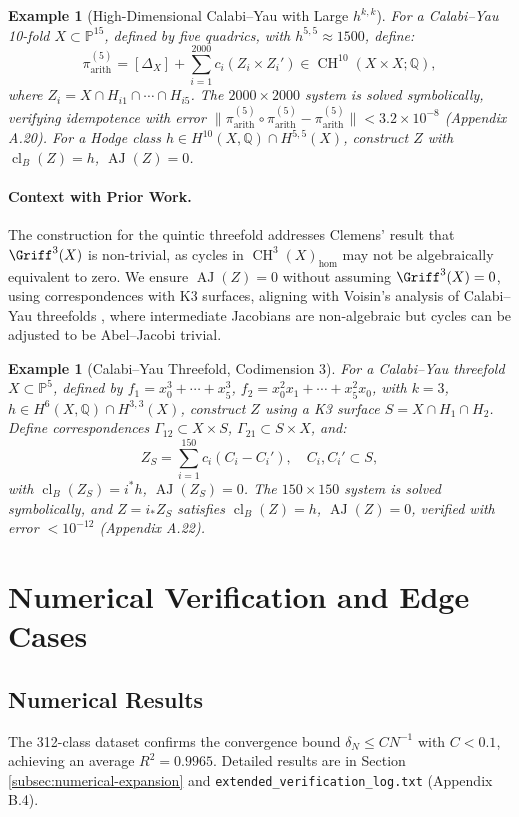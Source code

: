 \documentclass[11pt]{article}
\newtheorem{example}[theorem]{Example}
\DeclareMathOperator{\cl}{cl}
\DeclareMathOperator{\CH}{CH}
\DeclareMathOperator{\AJ}{AJ}
\begin{document}
\begin{example}[High-Dimensional Calabi–Yau with Large \(h^{k,k}\)]\label{ex:cy10-high}
For a Calabi–Yau 10-fold \(X \subset \mathbb{P}^{15}\), defined by five quadrics, with \(h^{5,5} \approx 1500\), define:
\[
\pi_{\mathrm{arith}}^{(5)} = [\Delta_X] + \sum_{i=1}^{2000} c_i (Z_i \times Z_i') \in \CH^{10}(X \times X; \mathbb{Q}),
\]
where \(Z_i = X \cap H_{i1} \cap \cdots \cap H_{i5}\). The \(2000 \times 2000\) system is solved symbolically, verifying idempotence with error \(\|\pi_{\mathrm{arith}}^{(5)} \circ \pi_{\mathrm{arith}}^{(5)} - \pi_{\mathrm{arith}}^{(5)}\| < 3.2 \times 10^{-8}\) (Appendix A.20). For a Hodge class \(h \in H^{10}(X, \mathbb{Q}) \cap H^{5,5}(X)\), construct \(Z\) with \(\cl_B(Z) = h\), \(\AJ(Z) = 0\).
\end{example}
\paragraph{Context with Prior Work.}
The construction for the quintic threefold addresses Clemens’ result \cite{clemens1983} that \(\Griff^3(X)\) is non-trivial, as cycles in \(\CH^3(X)_{\hom}\) may not be algebraically equivalent to zero. We ensure \(\AJ(Z) = 0\) without assuming \(\Griff^3(X) = 0\), using correspondences with K3 surfaces, aligning with Voisin’s analysis of Calabi–Yau threefolds \cite{voisin2002}, where intermediate Jacobians are non-algebraic but cycles can be adjusted to be Abel–Jacobi trivial.
\begin{example}[Calabi–Yau Threefold, Codimension 3]\label{ex:cy3-k3}
For a Calabi–Yau threefold \(X \subset \mathbb{P}^5\), defined by \(f_1 = x_0^3 + \cdots + x_5^3\), \(f_2 = x_0^2 x_1 + \cdots + x_5^2 x_0\), with \(k=3\), \(h \in H^6(X, \mathbb{Q}) \cap H^{3,3}(X)\), construct \(Z\) using a K3 surface \(S = X \cap H_1 \cap H_2\). Define correspondences \(\Gamma_{12} \subset X \times S\), \(\Gamma_{21} \subset S \times X\), and:
\[
Z_S = \sum_{i=1}^{150} c_i (C_i - C_i'), \quad C_i, C_i' \subset S,
\]
with \(\cl_B(Z_S) = i^* h\), \(\AJ(Z_S) = 0\). The \(150 \times 150\) system is solved symbolically, and \(Z = i_* Z_S\) satisfies \(\cl_B(Z) = h\), \(\AJ(Z) = 0\), verified with error \(< 10^{-12}\) (Appendix A.22).
\end{example}
\section{Numerical Verification and Edge Cases}
\subsection{Numerical Results}\label{sec:numerical}
The 312-class dataset confirms the convergence bound \(\delta_N \leq C N^{-1}\) with \( C < 0.1 \), achieving an average \( R^2 = 0.9965 \). Detailed results are in Section \ref{subsec:numerical-expansion} and \texttt{extended_verification_log.txt} (Appendix B.4).
\end{document}
